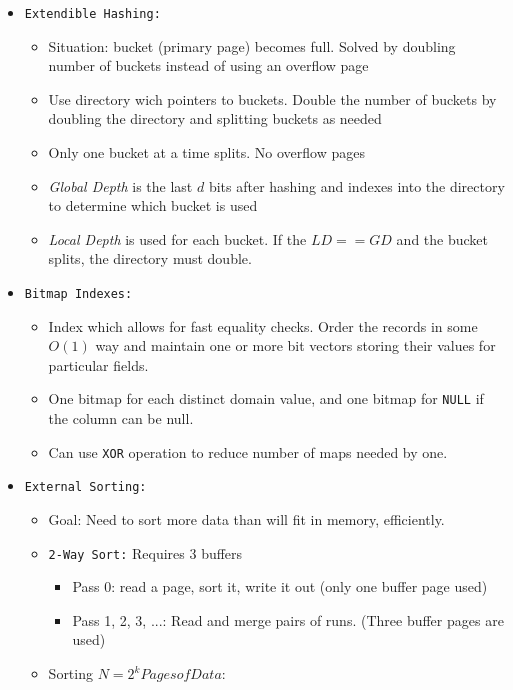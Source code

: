 \documentclass[landscape,8pt]{extarticle}
\newcommand{\code}{\lstinline}
\begin{document}
\begin{multicols}{4}
\begin{itemize}
        \item \code{Extendible Hashing:}
              \begin{itemize}
                  \item Situation: bucket (primary page) becomes full. Solved by doubling number of buckets instead of using an overflow page
                  \item Use directory wich pointers to buckets. Double the number of buckets by doubling the directory and splitting buckets as needed
                  \item Only one bucket at a time splits. No overflow pages
                  \item \emph{Global Depth} is the last $d$ bits after hashing and indexes into the directory to determine which bucket is used
                  \item \emph{Local Depth} is used for each bucket. If the $LD == GD$ and the bucket splits, the directory must double.
              \end{itemize}
        \item \code{Bitmap Indexes:}
              \begin{itemize}
                  \item Index which allows for fast equality checks. Order the records in some $O(1)$ way and maintain one or more bit vectors storing their values for particular fields.
                  \item One bitmap for each distinct domain value, and one bitmap for \code{NULL} if the column can be null.
                  \item Can use \code{XOR} operation to reduce number of maps needed by one.
              \end{itemize}
        \item \code{External Sorting:}
        \begin{itemize}
            \item Goal: Need to sort more data than will fit in memory, efficiently.
            \item \code{2-Way Sort:} Requires 3 buffers
            \begin{itemize}
                \item Pass 0: read a page, sort it, write it out (only one buffer page used)
                \item Pass 1, 2, 3, ...: Read and merge pairs of runs. (Three buffer pages are used)
            \end{itemize}
            \item Sorting $N=2^k Pages of Data$:

\end{itemize}
\end{itemize}
\end{multicols}
\end{document}
